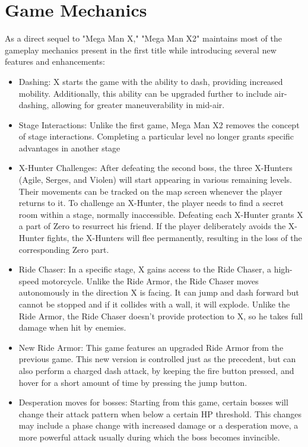 \section{Game Mechanics}
As a direct sequel to "Mega Man X," "Mega Man X2" maintains most of the gameplay mechanics present in the first title while introducing several new features and enhancements:
\begin{itemize}
	\item Dashing: X starts the game with the ability to dash, providing increased mobility. Additionally, this ability can be upgraded further to include air-dashing, allowing for greater maneuverability in mid-air.
	\item Stage Interactions: Unlike the first game, Mega Man X2 removes the concept of stage interactions. Completing a particular level no longer grants specific advantages in another stage
	\item X-Hunter Challenges: After defeating the second boss, the three X-Hunters (Agile, Serges, and Violen) will start appearing in various remaining levels. Their movements can be tracked on the map screen whenever the player returns to it. To challenge an X-Hunter, the player needs to find a secret room within a stage, normally inaccessible. Defeating each X-Hunter grants X a part of Zero to resurrect his friend. If the player deliberately avoids the X-Hunter fights, the X-Hunters will flee permanently, resulting in the loss of the corresponding Zero part. 
	\item Ride Chaser: In a specific stage, X gains access to the Ride Chaser, a high-speed motorcycle. Unlike the Ride Armor, the Ride Chaser moves autonomously in the direction X is facing. It can jump and dash forward but cannot be stopped and if it collides with a wall, it will explode. Unlike the Ride Armor, the Ride Chaser doesn't provide protection to X, so he takes full damage when hit by enemies.
	\item New Ride Armor: This game features an upgraded Ride Armor from the previous game. This new version is controlled just as the precedent, but can also perform a charged dash attack, by keeping the fire button pressed, and hover for a short amount of time by pressing the jump button.
	\item Desperation moves for bosses: Starting from this game, certain bosses will change their attack pattern when below a certain HP threshold. This changes may include a phase change with increased damage or a desperation move, a more powerful attack usually during which the boss becomes invincible.
\end{itemize}

